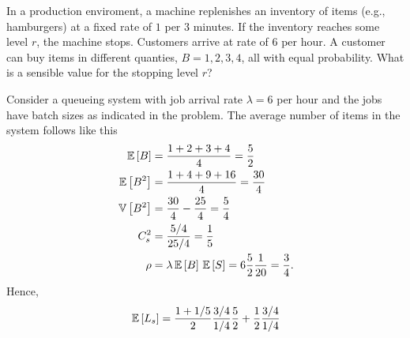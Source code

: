 \begin{question}
  In a production enviroment, a machine replenishes an inventory of
  items (e.g., hamburgers) at a fixed rate of $1$ per 3 minutes. If
  the inventory reaches some level $r$, the machine stops.  Customers
  arrive at rate of 6 per hour. A customer can buy items in different
  quanties, $B=1,2,3,4$, all with equal probability. What is a
  sensible value for the stopping level $r$?  

  \begin{solution}
    Consider a queueing system with job arrival rate $\lambda=6$ per
    hour and the jobs have batch sizes as indicated in the
    problem. The average number of items in the system  follows like this
    \begin{align*}
      \,\mathbb{E}\left[B\right] &= \frac{1+2+3+4}{4} = \frac 52 \\
      \,\mathbb{E}\left[B^2\right] &= \frac{1+4+9+16}{4} = \frac{30}4\\
      \,\mathbb{V}\left[B^2\right] &= \frac{30}4 - \frac{25}4 = \frac 5 4\\
      C_s^2 &= \frac{5/4}{25/4} = \frac 15\\
      \rho &= \lambda \,\mathbb{E}\left[B\right] \,\mathbb{E}\left[S\right] = 6 \frac 52 \frac 1{20} = \frac 34.
    \end{align*}
Hence, 
\begin{equation*}
  \,\mathbb{E}\left[L_s\right] = \frac {1+1/5}2 \frac{3/4}{1/4} \frac 52 + \frac 12 \frac{3/4}{1/4} 
\end{equation*}

    
  \end{solution}
\end{question}

